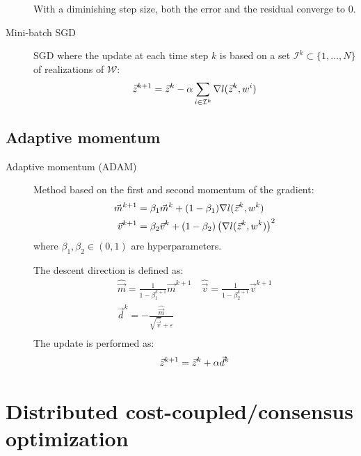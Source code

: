 \begin{description}
        \begin{theorem} 
            With a diminishing step size, both the error and the residual converge to $0$.
        \end{theorem}

    \item[Mini-batch SGD] 
        SGD where the update at each time step $k$ is based on a set $\mathcal{I}^k \subset \{ 1, \dots, N \}$ of realizations of $\mathcal{W}$:
        \[ {\vec{z}}^{k+1} = {\vec{z}}^k - \alpha \sum_{i \in \mathcal{I}^k} \nabla l({\vec{z}}^k, w^i) \]
\end{description}


\subsection{Adaptive momentum}

\begin{description}
    \item[Adaptive momentum (ADAM)] 
        Method based on the first and second momentum of the gradient:
        \[
            \begin{split}
                \vec{m}^{k+1} &= \beta_1 \vec{m}^k + (1-\beta_1) \nabla l({\vec{z}}^k, w^k) \\
                \vec{v}^{k+1} &= \beta_2 \vec{v}^k + (1-\beta_2) \left( \nabla l({\vec{z}}^k, w^k) \right)^2
            \end{split}
        \]
        where $\beta_1, \beta_2 \in (0, 1)$ are hyperparameters.
        
        The descent direction is defined as:
        \[
            \begin{gathered}
                \hat{\vec{m}} = \frac{1}{1 - \beta_1^{k+1}} \vec{m}^{k+1}
                \quad
                \hat{\vec{v}} = \frac{1}{1 - \beta_2^{k+1}} \vec{v}^{k+1} \\
                \vec{d}^k = - \frac{\hat{\vec{m}}}{\sqrt{\hat{\vec{v}}} + \varepsilon} \\
            \end{gathered}
        \]
        The update is performed as:
        \[ {\vec{z}}^{k+1} = {\vec{z}}^{k} + \alpha \vec{d}^k \]
\end{description}



\section{Distributed cost-coupled/consensus optimization}

